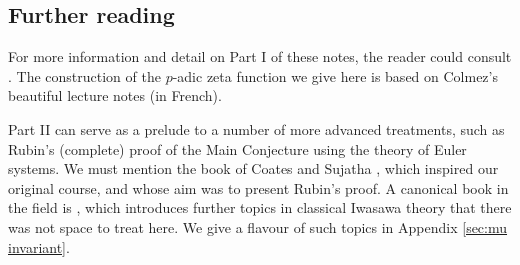 \documentclass[a4paper,10pt, english, reqno]{smfart}
\numberwithin{equation}{section}
\begin{document}

\subsection*{Further reading}
For more information and detail on Part I of these notes, the reader could consult \cite{Lan90}. The construction of the $p$-adic zeta function we give here is based on Colmez's beautiful lecture notes \cite{ColCourse} (in French).

Part II can serve as a prelude to a number of more advanced treatments, such as Rubin's (complete) proof of the Main Conjecture using the theory of Euler systems. We must mention the book of Coates and Sujatha \cite{CS06}, which inspired our original course, and whose aim was to present Rubin's proof. A canonical book in the field is \cite{Washington2}, which introduces further topics in classical Iwasawa theory that there was not space to treat here. We give a flavour of such topics in Appendix \ref{sec:mu invariant}. 
\end{document}
